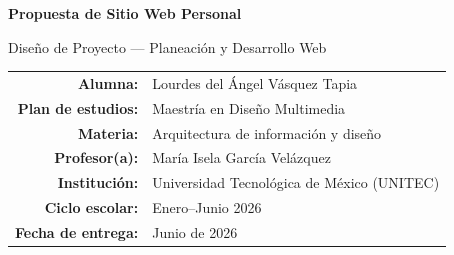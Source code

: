 \documentclass[12pt, letterpaper]{article}
\begin{document}
\begin{titlepage}
\pagecolor{luluDark}
\color{white}
\centering
\vspace*{2cm}


\vspace{1.2cm}

{\LARGE\bfseries Propuesta de Sitio Web Personal}

\vspace{0.4cm}

{\large Diseño de Proyecto — Planeación y Desarrollo Web}

\vspace{2.2cm}

\begin{tabular}{rl}
  \textbf{Alumna:}             & Lourdes del Ángel Vásquez Tapia \\[7pt]
  \textbf{Plan de estudios:}   & Maestría en Diseño Multimedia \\[7pt]
  \textbf{Materia:}            & Arquitectura de información y diseño  \\[7pt]
  \textbf{Profesor(a):}        & María Isela García Velázquez       \\[7pt]
  \textbf{Institución:}        & Universidad Tecnológica de México (UNITEC)     \\[7pt]
  \textbf{Ciclo escolar:}      & Enero--Junio 2026 \\[7pt]
  \textbf{Fecha de entrega:}   & Junio de 2026                    \\
\end{tabular}

\vfill


\vspace{0.5cm}

\end{titlepage}
\end{document}

